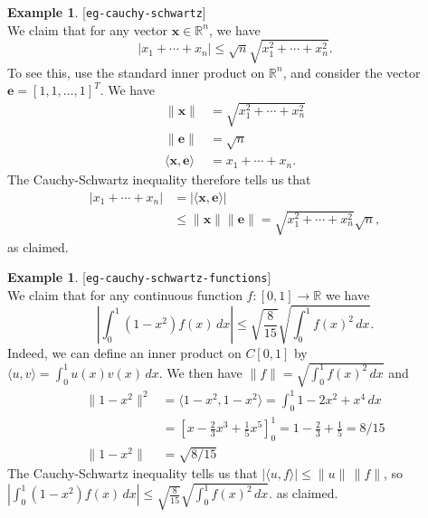 \documentclass{amsart}
\newcommand{\lbl}[1]{\label{#1}\textup{[\texttt{#1}]}\ \\}
\newcommand{\lbl}{\label}
\newcommand{\R}         {{\mathbb{R}}}
\newcommand{\ip}[1]     {\langle #1\rangle}
\newcommand{\ve}        {\mathbf{e}}
\newcommand{\vx}        {\mathbf{x}}
\renewcommand{\:}       {\colon}
\theoremstyle{definition}
\newtheorem{example}[theorem]{Example}
\begin{document}
\begin{example}\lbl{eg-cauchy-schwartz}
 We claim that for any vector $\vx\in\R^n$, we have
 \[ |x_1+\dotsb+x_n| \leq
     \sqrt{n}\sqrt{x_1^2+\dotsb+x_n^2}.
 \] 
 To see this, use the standard inner product on $\R^n$, and
 consider the vector $\ve=[1,1,\dotsc,1]^T$.  We have 
 \begin{align*}
  \|\vx\| &= \sqrt{x_1^2+\dotsb+x_n^2} \\
  \|\ve\| &= \sqrt{n} \\
  \ip{\vx,\ve} &= x_1+\dotsb+x_n.
 \end{align*}
 The Cauchy-Schwartz inequality therefore tells us that 
 \begin{align*}
  | x_1+\dotsb +x_n | &= |\ip{\vx,\ve}| \\
    &\leq \|\vx\|\|\ve\| = \sqrt{x_1^2+\dotsb+x_n^2} \sqrt{n},
 \end{align*}
 as claimed.
\end{example}
\begin{example}\lbl{eg-cauchy-schwartz-functions}
  We claim that for any continuous function $f\:[0,1]\to\R$
 we have 
 \[ \left|\int_0^1(1-x^2)f(x)\,dx\right| \leq
     \sqrt{\frac{8}{15}}
      \sqrt{\textstyle\int_0^1 f(x)^2\,dx}.
 \]
 Indeed, we can define an inner product on $C[0,1]$ by
 $\ip{u,v}=\int_0^1u(x)v(x)\,dx$.  We then have 
 $\|f\|=\sqrt{\textstyle\int_0^1 f(x)^2\,dx}$ and\vspace{-1ex}
 \begin{align*}
  \|1-x^2\|^2 &= \ip{1-x^2,1-x^2} 
    = \int_0^1 1-2x^2+x^4\,dx \\
    &= \left[ x - \tfrac{2}{3} x^3 + \tfrac{1}{5}x^5\right]_0^1
    = 1 - \tfrac{2}{3} + \tfrac{1}{5} = 8/15 \\
  \|1-x^2\| &= \sqrt{8/15}
 \end{align*}
 The Cauchy-Schwartz inequality tells us that
 $|\ip{u,f}|\leq\|u\|\,\|f\|$, so
 $ \left|\int_0^1(1-x^2)f(x)\,dx\right| \leq
     \sqrt{\frac{8}{15}}
      \sqrt{\textstyle\int_0^1 f(x)^2\,dx}.
 $
 as claimed.
\end{example}
\end{document}
